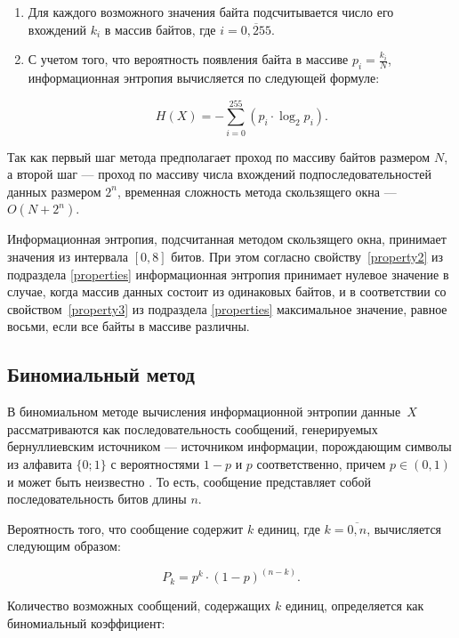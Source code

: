 \begin{enumerate}
	\item Для каждого возможного значения байта подсчитывается число его вхождений $k_{i}$ в массив байтов, где $i = \overline{0, 255}$.
	\item С учетом того, что вероятность появления байта в массиве $p_{i} = \frac{k_{i}}{N}$, информационная энтропия вычисляется по следующей формуле:
	
	\begin{equation}
		H(X) = -\sum_{i = 0}^{255} (p_{i} \cdot \log_{2}p_{i}).
	\end{equation}
\end{enumerate}

Так как первый шаг метода предполагает проход по массиву байтов размером $N$, а второй шаг --- проход по массиву числа вхождений подпоследовательностей данных размером $2^n$, временная сложность метода скользящего окна --- $O(N + 2^n)$. 

Информационная энтропия, подсчитанная методом скользящего окна, принимает значения из интервала $[0, 8]$ битов. При этом согласно свойству~\ref{property2} из подраздела \ref{properties} информационная энтропия принимает нулевое значение в случае, когда массив данных состоит из одинаковых байтов, и в соответствии со свойством~\ref{property3} из подраздела \ref{properties} максимальное значение, равное восьми, если все байты в массиве различны.

\subsection{Биномиальный метод}\label{binomial}

В биномиальном методе вычисления информационной энтропии \cite{binomial-method} данные~$X$ рассматриваются как последовательность сообщений, генерируемых бернуллиевским источником --- источником информации, порождающим символы из алфавита $\{0; 1\}$ с вероятностями $1 - p$ и $p$ соответственно, причем $p \in (0, 1)$ и может быть неизвестно \cite{bernullie-source}. То есть, сообщение представляет собой последовательность битов длины $n$.

Вероятность того, что сообщение содержит $k$ единиц, где $k = \overline{0, n}$, вычисляется следующим образом:

\begin{equation}\label{pk}
	P_{k} = p^k \cdot (1 - p)^{(n - k)}.
\end{equation} 

Количество возможных сообщений, содержащих $k$ единиц, определяется как биномиальный коэффициент:

